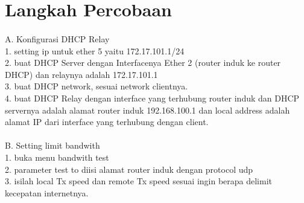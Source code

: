 \documentclass{article}
\begin{document}
    \section{Langkah Percobaan}
    \paragraph{}
    A. Konfigurasi DHCP Relay \\
    1. setting ip untuk ether 5 yaitu 172.17.101.1/24 \\ 
    2. buat DHCP Server dengan Interfacenya Ether 2 (router induk ke router DHCP)  dan relaynya adalah 172.17.101.1 \\
    3. buat DHCP network, sesuai network clientnya.\\
    4. buat DHCP Relay dengan interface yang terhubung router induk dan DHCP servernya adalah alamat router induk 192.168.100.1 dan local address adalah alamat IP dari interface yang terhubung dengan client.\\
    \paragraph{}
    B. Setting limit bandwith \\
    1. buka menu bandwith test \\
    2. parameter test to diisi alamat router induk dengan protocol udp \\
    3. isilah local Tx speed dan remote Tx speed sesuai ingin berapa delimit kecepatan internetnya. \\

    \newpage
\end{document}
